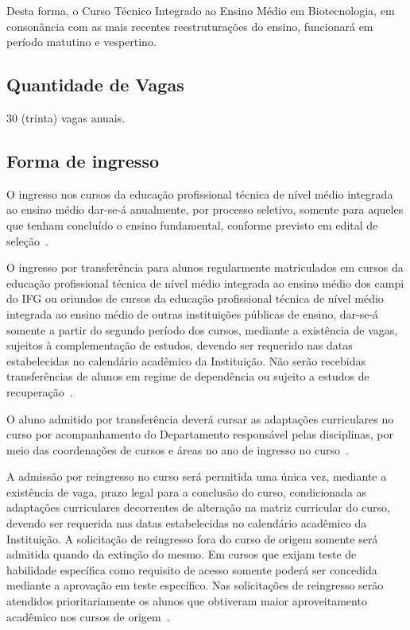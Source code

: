 \documentclass[11pt,fleqn]{book} %
\begin{document}
Desta forma, o Curso Técnico Integrado ao Ensino Médio em Biotecnologia, em consonância com as mais recentes reestruturações do ensino, funcionará em período matutino e vespertino.

\subsection{Quantidade de Vagas}
\indent

30 (trinta) vagas anuais. 


\subsection{Forma de ingresso}

O ingresso nos cursos da educação profissional técnica de nível médio integrada ao ensino médio dar-se-á anualmente, por processo seletivo, somente para aqueles que tenham concluído o ensino fundamental, conforme previsto em edital de seleção~\cite{Resolucao22De2011}.

O ingresso por transferência para alunos regularmente matriculados em cursos da educação profissional técnica de nível médio integrada ao ensino médio dos campi do IFG ou oriundos de cursos da educação profissional técnica de nível médio integrada ao ensino médio de outras instituições públicas de ensino, dar-se-á somente a partir do segundo período dos cursos, mediante a existência de vagas, sujeitos à complementação de estudos, devendo ser requerido nas datas estabelecidas no calendário acadêmico da Instituição.
Não serão recebidas transferências de alunos em regime de dependência ou sujeito a estudos de recuperação~\cite{Resolucao22De2011}.

O aluno admitido por transferência deverá cursar as adaptações curriculares no curso por acompanhamento do Departamento responsável pelas disciplinas, por meio das coordenações de cursos e áreas no ano de ingresso no curso~\cite{Resolucao22De2011}.

A admissão por reingresso no curso será permitida uma única vez, mediante a existência de vaga, prazo legal para a conclusão do curso, condicionada as adaptações curriculares decorrentes de alteração na matriz curricular do curso, devendo ser requerida nas datas estabelecidas no calendário acadêmico da Instituição.
A solicitação de reingresso fora do curso de origem somente será admitida quando da extinção do mesmo.
Em cursos que exijam teste de habilidade específica como requisito de acesso somente poderá ser concedida mediante a aprovação em teste específico.
Nas solicitações de reingresso serão atendidos prioritariamente os alunos que obtiveram maior aproveitamento acadêmico nos cursos de origem~\cite{Resolucao22De2011}.
\end{document}
